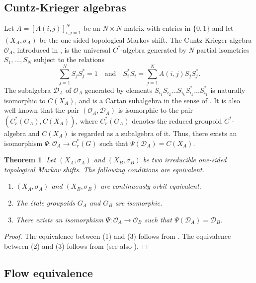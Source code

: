 \documentclass[11pt]{article}
\newtheorem{theorem}{Theorem}[section]
\theoremstyle{definition}
\numberwithin{equation}{section}
\begin{document}
\subsection{Cuntz-Krieger algebras}

Let $A=[A(i,j)]_{i,j=1}^N$ be an $N\times N$ matrix with entries in $\{0,1\}$ 
and let $(X_A,\sigma_A)$ be the one-sided topological Markov shift. 
The Cuntz-Krieger algebra $\mathcal{O}_A$, introduced in \cite{CK80Invent}, 
is the universal $C^*$-algebra 
generated by $N$ partial isometries $S_1,\dots,S_N$ subject to the relations 
\[
\sum_{j=1}^NS_jS_j^*=1\quad\text{and}\quad 
S_i^*S_i=\sum_{j=1}^NA(i,j)S_jS_j^*. 
\]
The subalgebra $\mathcal{D}_A$ of $\mathcal{O}_A$ 
generated by elements $S_{i_1}S_{i_2}\dots S_{i_k}S_{i_k}^*\dots S_{i_1}^*$ 
is naturally isomorphic to $C(X_A)$, 
and is a Cartan subalgebra in the sense of \cite{R08Irish}. 
It is also well-known that 
the pair $(\mathcal{O}_A,\mathcal{D}_A)$ is isomorphic to 
the pair $(C^*_r(G_A),C(X_A))$, 
where $C^*_r(G_A)$ denotes the reduced groupoid $C^*$-algebra and 
$C(X_A)$ is regarded as a subalgebra of it. 
Thus, 
there exists an isomorphism $\Psi:\mathcal{O}_A\to C^*_r(G)$ 
such that $\Psi(\mathcal{D}_A)=C(X_A)$. 

\begin{theorem}\label{coe=cartaniso}
Let $(X_A,\sigma_A)$ and $(X_B,\sigma_B)$ be 
two irreducible one-sided topological Markov shifts. 
The following conditions are equivalent. 
\begin{enumerate}
\item $(X_A,\sigma_A)$ and $(X_B,\sigma_B)$ are 
continuously orbit equivalent. 
\item The \'etale groupoids $G_A$ and $G_B$ are isomorphic. 
\item There exists an isomorphism $\Psi:\mathcal{O}_A\to\mathcal{O}_B$ 
such that $\Psi(\mathcal{D}_A)=\mathcal{D}_B$. 
\end{enumerate}
\end{theorem}
\begin{proof}
The equivalence between (1) and (3) 
follows from \cite[Theorem 1.1]{Matsumoto10PJM}. 
The equivalence between (2) and (3) 
follows from \cite[Proposition 4.11]{R08Irish} 
(see also \cite[Theorem 5.1]{Matui12PLMS}). 
\end{proof}




\subsection{Flow equivalence}
\end{document}
